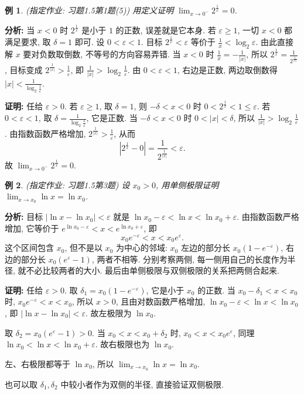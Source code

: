 \documentclass[UTF8,openany]{ctexbook}
\theoremstyle{chinesetextbook}
\newtheorem{example}{例}[section]
\newenvironment{cnproof}{\par\indent\textbf{证明:} \ignorespaces}{\par}
\begin{document}
\begin{example}\label{ex:h15-1-5}
\textnormal{(指定作业: 习题1.5第1题(5))} 用定义证明 $\displaystyle\lim_{x\to0^-}2^{\frac1x}=0$.
\end{example}
\par\indent\textbf{分析:} 当 $x<0$ 时 $2^{\frac1x}$ 是小于 $1$ 的正数, 误差就是它本身. 若 $\varepsilon\ge1$, 一切 $x<0$ 都满足要求, 取 $\delta=1$ 即可. 设 $0<\varepsilon<1$. 目标 $2^{\frac1x}<\varepsilon$ 等价于 $\displaystyle\frac1x<\log_2\varepsilon$. 由此直接解 $x$ 要对负数取倒数, 不等号的方向容易弄错. 当 $x<0$ 时 $\displaystyle\frac1x=-\frac1{|x|}$, 所以 $\displaystyle2^{\frac1x}=\frac1{2^{\frac1{|x|}}}$, 目标变成 $\displaystyle2^{\frac1{|x|}}>\frac1\varepsilon$, 即 $\displaystyle\frac1{|x|}>\log_2\frac1\varepsilon$. 由 $0<\varepsilon<1$, 右边是正数, 两边取倒数得 $\displaystyle|x|<\frac1{\log_2\frac1\varepsilon}$.
\begin{cnproof}
任给 $\varepsilon>0$. 若 $\varepsilon\ge1$, 取 $\delta=1$, 则 $-\delta<x<0$ 时 $0<2^{\frac1x}<1\le\varepsilon$. 若 $0<\varepsilon<1$, 取 $\displaystyle\delta=\frac1{\log_2\frac1\varepsilon}$, 它是正数. 当 $-\delta<x<0$ 时 $0<|x|<\delta$, 所以 $\displaystyle\frac1{|x|}>\log_2\frac1\varepsilon$. 由指数函数严格增加, $\displaystyle2^{\frac1{|x|}}>\frac1\varepsilon$, 从而
\[
\left|2^{\frac1x}-0\right|=\frac1{2^{\frac1{|x|}}}<\varepsilon.
\]
故 $\displaystyle\lim_{x\to0^-}2^{\frac1x}=0$.
\end{cnproof}
\begin{example}\label{ex:h15-3}
\textnormal{(指定作业: 习题1.5第3题)} 设 $x_0>0$, 用单侧极限证明 $\displaystyle\lim_{x\to x_0}\ln x=\ln x_0$.
\end{example}
\par\indent\textbf{分析:} 目标 $|\ln x-\ln x_0|<\varepsilon$ 就是 $\ln x_0-\varepsilon<\ln x<\ln x_0+\varepsilon$. 由指数函数严格增加, 它等价于 $e^{\ln x_0-\varepsilon}<x<e^{\ln x_0+\varepsilon}$, 即
\[
x_0e^{-\varepsilon}<x<x_0e^{\varepsilon}.
\]
这个区间包含 $x_0$, 但不是以 $x_0$ 为中心的邻域: $x_0$ 左边的部分长 $x_0(1-e^{-\varepsilon})$, 右边的部分长 $x_0(e^\varepsilon-1)$, 两者不相等. 分别考察两侧, 每一侧用自己的长度作为半径, 就不必比较两者的大小. 最后由单侧极限与双侧极限的关系把两侧合起来.
\begin{cnproof}
任给 $\varepsilon>0$. 取 $\delta_1=x_0(1-e^{-\varepsilon})$, 它是小于 $x_0$ 的正数. 当 $x_0-\delta_1<x<x_0$ 时, $x_0e^{-\varepsilon}<x<x_0$, 所以 $x>0$, 且由对数函数严格增加, $\ln x_0-\varepsilon<\ln x<\ln x_0$, 即 $|\ln x-\ln x_0|<\varepsilon$. 故左极限为 $\ln x_0$.

取 $\delta_2=x_0(e^{\varepsilon}-1)>0$. 当 $x_0<x<x_0+\delta_2$ 时, $x_0<x<x_0e^{\varepsilon}$, 同理 $\ln x_0<\ln x<\ln x_0+\varepsilon$. 故右极限也为 $\ln x_0$.

左、右极限都等于 $\ln x_0$, 所以 $\displaystyle\lim_{x\to x_0}\ln x=\ln x_0$.
\end{cnproof}
也可以取 $\delta_1,\delta_2$ 中较小者作为双侧的半径, 直接验证双侧极限.
\end{document}
